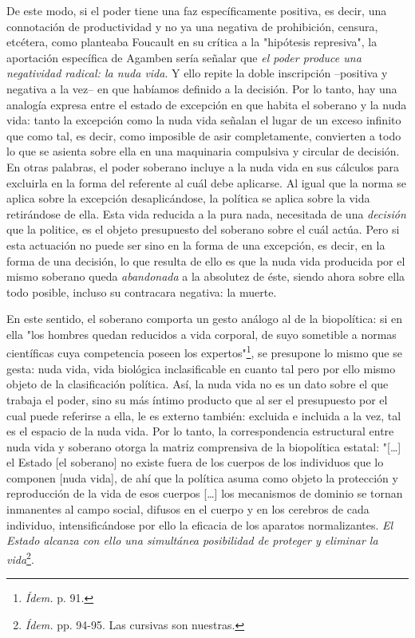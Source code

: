 \documentclass{book}
\begin{document}
De este modo, si el poder tiene una faz específicamente positiva, es
decir, una connotación de productividad y no ya una negativa de
prohibición, censura, etcétera, como planteaba Foucault en su crítica a
la "hipótesis represiva", la aportación específica de Agamben sería
señalar que \emph{el poder produce una negatividad radical: la nuda
vida}. Y ello repite la doble inscripción --positiva y negativa a la
vez-- en que habíamos definido a la decisión. Por lo tanto, hay una
analogía expresa entre el estado de excepción en que habita el soberano
y la nuda vida: tanto la excepción como la nuda vida señalan el lugar de
un exceso infinito que como tal, es decir, como imposible de asir
completamente, convierten a todo lo que se asienta sobre ella en una
maquinaria compulsiva y circular de decisión. En otras palabras, el
poder soberano incluye a la nuda vida en sus cálculos para excluirla en
la forma del referente al cuál debe aplicarse. Al igual que la norma se
aplica sobre la excepción desaplicándose, la política se aplica sobre la
vida retirándose de ella. Esta vida reducida a la pura nada, necesitada
de una \emph{decisión} que la politice, es el objeto presupuesto del
soberano sobre el cuál actúa. Pero si esta actuación no puede ser sino
en la forma de una excepción, es decir, en la forma de una decisión, lo
que resulta de ello es que la nuda vida producida por el mismo soberano
queda \emph{abandonada} a la absolutez de éste, siendo ahora sobre ella
todo posible, incluso su contracara negativa: la muerte.

En este sentido, el soberano comporta un gesto análogo al de la
biopolítica: si en ella "los hombres quedan reducidos a vida corporal,
de suyo sometible a normas científicas cuya competencia poseen los
expertos"\footnote{\emph{Ídem.} p. 91.}, se presupone lo mismo que se
gesta: nuda vida, vida biológica inclasificable en cuanto tal pero por
ello mismo objeto de la clasificación política. Así, la nuda vida no es
un dato sobre el que trabaja el poder, sino su más íntimo producto que
al ser el presupuesto por el cual puede referirse a ella, le es externo
también: excluida e incluida a la vez, tal es el espacio de la nuda
vida. Por lo tanto, la correspondencia estructural entre nuda vida y
soberano otorga la matriz comprensiva de la biopolítica estatal:
"{[}\ldots{]} el Estado {[}el soberano{]} no existe fuera de los cuerpos
de los individuos que lo componen {[}nuda vida{]}, de ahí que la
política asuma como objeto la protección y reproducción de la vida de
esos cuerpos {[}\ldots{]} los mecanismos de dominio se tornan inmanentes
al campo social, difusos en el cuerpo y en los cerebros de cada
individuo, intensificándose por ello la eficacia de los aparatos
normalizantes. \emph{El Estado alcanza con ello una simultánea
posibilidad de proteger y eliminar la vida}\footnote{\emph{Ídem.} pp.
  94-95. Las cursivas son nuestras.}.
\end{document}
